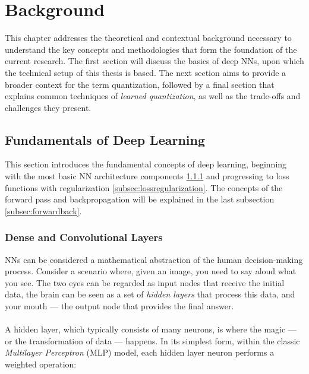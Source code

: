 \chapter{Background\label{cha:chapter2}}
This chapter addresses the theoretical and contextual background 
necessary to understand the key concepts and methodologies 
that form the foundation of the current research.
The first section will discuss the basics of deep NNs, 
upon which the technical setup of this thesis is based.
The next section aims to provide a broader context for the term quantization, 
followed by a final section that explains common techniques of \textit{learned quantization}, 
as well as the trade-offs and challenges they present. 


\section{Fundamentals of Deep Learning}
\label{sec:deeplearning}
This section introduces the fundamental concepts of deep learning, 
beginning with the most basic NN architecture components \ref{subsec:denseconvolutional} and progressing to loss functions with regularization \ref{subsec:lossregularization}. 
The concepts of the forward pass and backpropagation will be explained in the last subsection \ref{subsec:forwardback}.

\subsection{Dense and Convolutional Layers}
\label{subsec:denseconvolutional}
NNs can be considered a mathematical abstraction of the human decision-making process. 
Consider a scenario where, given an image, you need to say aloud what you see. 
The two eyes can be regarded as input nodes that receive the initial data, 
the brain can be seen as a set of \textit{hidden layers} that process this data, 
and your mouth — the output node that provides the final answer.
\\
\\
A hidden layer, which typically consists of many neurons, is where the magic
 — or the transformation of data — happens. In its simplest form, 
 within the classic \textit{Multilayer Perceptron} (MLP) model,
 each hidden layer neuron performs a weighted operation:

